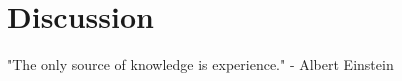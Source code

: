 \chapter{Discussion}
\label{chapter:Discussion}

\begin{introduction}
    "The only source of knowledge is experience." - Albert Einstein
\end{introduction}

